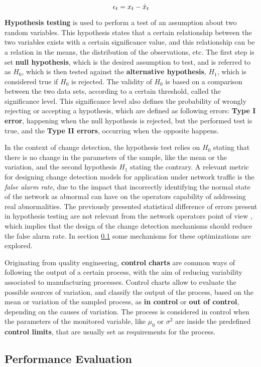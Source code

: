 \begin {equation*}
\centering
\epsilon_t = x_t - \hat{x}_t
\end {equation*}

\par \textbf{Hypothesis testing} is used to perform a test of an assumption about two random variables. This hypothesis states that a certain relationship between the two variables exists with a certain significance value, and this
relationship can be a relation in the means, the distribution of the observations, etc. The first step is set \textbf{null hypothesis}, which is the desired assumption to test, and is referred to as $H_0$, which is then tested
against the \textbf{alternative hypothesis}, $H_1$, which is considered true if $H_0$ is rejected. The validity of $H_0$ is based on a comparison between the two data sets, according to a certain threshold, called the significance
level. This significance level also defines the probability of wrongly rejecting or accepting a hypothesis, which are defined as following errors: \textbf{Type I error}, happening when the null hypothesis is rejected, but the 
performed test is true, and the \textbf{Type II errors}, occurring when the opposite happens.

\par In the context of change detection, the hypothesis test relies on $H_0$ stating that there is no change in the parameters of the sample, like the mean or the variation, and the second hypothesis $H_1$ stating the contrary.
A relevant metric for designing change detection models for application under network traffic is the \textit{false alarm rate},
due to the impact that incorrectly identifying the normal state of the network as abnormal can have on the operators capability of addressing real abnormalities. The previously presented statistical difference of errors 
present in hypothesis testing are not relevant from the network operators point of view \cite{CITE - https://www.net.in.tum.de/fileadmin/TUM/NET/NET-2010-06-1.pdf},
which implies that the design of the change detection mechanisms should reduce the false alarm rate. In section \ref{subsec:performance_evaluation} some mechanisms for these optimizations are explored.

\par Originating from quality engineering, \textbf{control charts} are common ways of following the output of a certain process, with the aim of reducing variability associated to manufacturing processes. Control charts allow to 
evaluate the possible sources of variation, and classify the output of the process, based on the mean or variation of the sampled process, as \textbf{in control} or \textbf{out of control}, depending on the causes of variation. 
The process is considered in control when the parameters of the monitored variable, like $\mu_0$ or $\sigma^2$ are inside the predefined \textbf{control limits}, that are usually set as requirements for the process.

\par 

\subsection {Performance Evaluation} \label{subsec:performance_evaluation}

